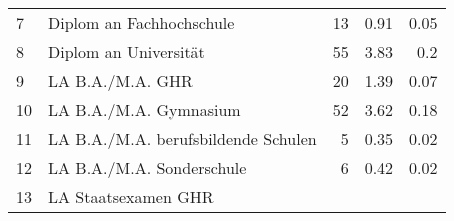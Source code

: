 \begin{longtable}{lXrrr}
     7 &
     \multicolumn{1}{X}{ Diplom an Fachhochschule   } &


       \num{13} &
       \num[round-mode=places,round-precision=2]{0,91} &
         \num[round-mode=places,round-precision=2]{0,05} \\

     8 &
     \multicolumn{1}{X}{ Diplom an Universität   } &


       \num{55} &
       \num[round-mode=places,round-precision=2]{3,83} &
         \num[round-mode=places,round-precision=2]{0,2} \\

     9 &
     \multicolumn{1}{X}{ LA B.A./M.A. GHR   } &


       \num{20} &
       \num[round-mode=places,round-precision=2]{1,39} &
         \num[round-mode=places,round-precision=2]{0,07} \\

     10 &
     \multicolumn{1}{X}{ LA B.A./M.A. Gymnasium   } &


       \num{52} &
       \num[round-mode=places,round-precision=2]{3,62} &
         \num[round-mode=places,round-precision=2]{0,18} \\

     11 &
     \multicolumn{1}{X}{ LA B.A./M.A. berufsbildende Schulen   } &


       \num{5} &
       \num[round-mode=places,round-precision=2]{0,35} &
         \num[round-mode=places,round-precision=2]{0,02} \\

     12 &
     \multicolumn{1}{X}{ LA B.A./M.A. Sonderschule   } &


       \num{6} &
       \num[round-mode=places,round-precision=2]{0,42} &
         \num[round-mode=places,round-precision=2]{0,02} \\

     13 &
     \multicolumn{1}{X}{ LA Staatsexamen GHR   } &



\end{longtable}
